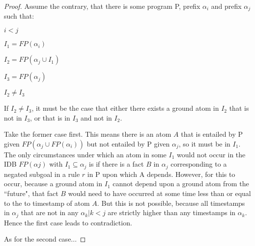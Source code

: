\begin{proof}



Assume the contrary, that there is some program P, prefix $\alpha_i$ and prefix $\alpha_j$  such that:

$i < j$

$I_1 = FP(\alpha_i)$

$I_2 = FP(\alpha_j \cup I_1)$

$I_3 = FP(\alpha_j)$

$I_2 \neq I_3$


If $I_2 \neq I_3$, it must be the case that either there exists a ground atom in $I_2$ that is not in $I_3$, or that is in
$I_3$ and not in $I_2$.  

Take the former case first.  This means there is an atom $A$ that is entailed by P given $FP(\alpha_{j} \cup FP(\alpha_{i}))$
but not entailed by P given $\alpha_{j}$, so it must be in $I_1$.   The only circumstances under which an atom in some
$I_1$ would not occur in the IDB $FP(\alpha{j})$ with $I_1 \subseteq \alpha_{j}$ is if there is a fact $B$ in $\alpha_{j}$ 
corresponding to a negated subgoal in a rule $r$ in P upon which A depends.  However, for this to occur, because a ground atom 
in $I_1$ cannot depend upon a ground atom from the ``future", that fact $B$ would need to have occurred at some time less than 
or equal to the to timestamp of atom $A$.  But this is not possible, because all timestamps in $\alpha_{j}$ that are not in any $\alpha_{k} | k<j$
are strictly higher than any timestamps in $\alpha_{k}$.  Hence the first case leads to contradiction.

As for the second case...

\end{proof}

